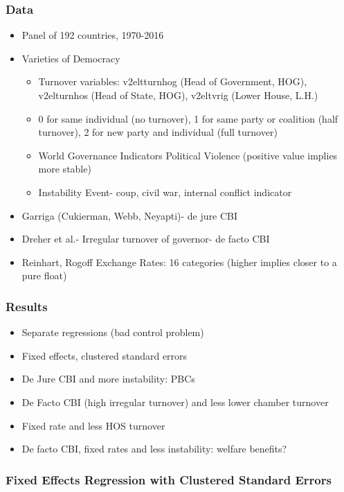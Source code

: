 \documentclass{beamer}
\begin{document}
    \begin{frame}
        \frametitle{Data}
        \begin{itemize}
            \item Panel of 192 countries, 1970-2016
            \item Varieties of Democracy
            \begin{itemize}
                \item Turnover variables: v2eltturnhog (Head of Government, HOG), v2elturnhos (Head of State, HOG), v2eltvrig (Lower House, L.H.)
                \item 0 for same individual (no turnover), 1 for same party or coalition (half turnover), 2 for new party and individual (full turnover)
                \item World Governance Indicators Political Violence (positive value implies more stable)
                \item Instability Event- coup, civil war, internal conflict indicator
            \end{itemize}
            \item Garriga (Cukierman, Webb, Neyapti)- de jure CBI
            \item Dreher et al.- Irregular turnover of governor- de facto CBI
            \item Reinhart, Rogoff Exchange Rates: 16 categories (higher implies closer to a pure float)
        \end{itemize}
    \end{frame}

    \begin{frame}
        \frametitle{Results}
        \begin{itemize}
            \item Separate regressions (bad control problem)
            \item Fixed effects, clustered standard errors
            \item De Jure CBI and more instability: PBCs
            \item De Facto CBI (high irregular turnover) and less lower chamber turnover
            \item Fixed rate and less HOS turnover
            \item De facto CBI, fixed rates and less instability: welfare benefits?
        \end{itemize}
    \end{frame}

    \begin{frame}
        \frametitle{Fixed Effects Regression with Clustered Standard Errors}
        {
            \let\oldcentering\centering
            \renewcommand\centering{\tiny\oldcentering}
            
        }
    \end{frame}
\end{document}
